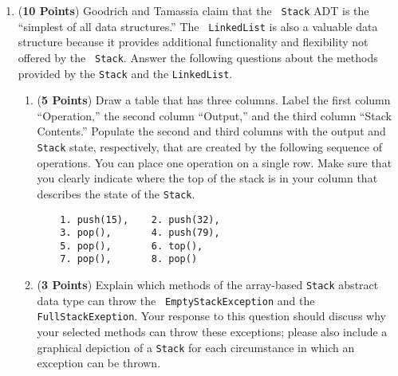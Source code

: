 \documentclass[12pt]{article}
\begin{document}
\begin{enumerate}
\begin{enumerate}

%
\end{enumerate}

\newpage

\item ({\bf 10 Points}) Goodrich and Tamassia claim that the {\tt
  Stack} ADT is the ``simplest of all data structures.''  The {\tt
  LinkedList} is also a valuable data structure because it provides
  additional functionality and flexibility not offered by the {\tt
    Stack}.  Answer the following questions about the methods provided
  by the {\tt Stack} and the {\tt LinkedList}.

\begin{enumerate}

\item ({\bf 5 Points}) Draw a table that has three columns.  Label the
  first column ``Operation,'' the second column ``Output,'' and the
  third column ``Stack Contents.''  Populate the second and third
  columns with the output and {\tt Stack} state, respectively, that
  are created by the following sequence of operations.  You can place
  one operation on a single row.  Make sure that you clearly indicate
  where the top of the stack is in your column that describes the
  state of the {\tt Stack}.

  \begin{verbatim}
    1. push(15),    2. push(32),
    3. pop(),       4. push(79),
    5. pop(),       6. top(),
    7. pop(),       8. pop()
  \end{verbatim}


\item ({\bf 3 Points}) Explain which methods of the array-based {\tt Stack} abstract data type can throw the {\tt
    EmptyStackException} and the {\tt FullStackExeption}.  Your response to this question should discuss why your
  selected methods can throw these exceptions; please also include a graphical depiction of a {\tt Stack} for each
  circumstance in which an exception can be thrown.


\end{enumerate}
\end{enumerate}
\end{document}
